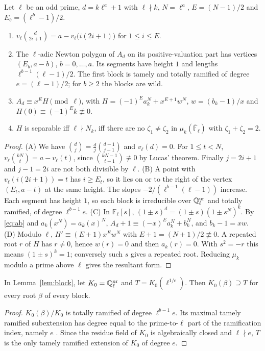 \documentclass[11pt]{amsart}
\theoremstyle{definition}\newtheorem{definition}[theorem]{Definition}\newtheorem{example}[theorem]{Example}
\theoremstyle{remark}\newtheorem{remark}[theorem]{Remark}
\newcommand{\Q}{\mathbb Q}\newcommand{\Z}{\mathbb Z}\newcommand{\F}{\mathbb F}
\begin{document}
\begin{lemma}\label{lem:block}
Let $\ell$ be an odd prime, $d=k\ell^a+1$ with $\ell\nmid k$, $N=\ell^a$, $E=(N-1)/2$ and $E_b=(\ell^b-1)/2$.
\begin{enumerate}
\item[(A)] $v_\ell\binom d{2i+1}=a-v_\ell\bigl(i(2i+1)\bigr)$ for $1\le i\le E$.
\item[(B)] The $\ell$-adic Newton polygon of $A_d$ on its positive-valuation part has vertices $(E_b,a-b)$, $b=0,\dots,a$. Its segments have height
$1$ and lengths $\ell^{b-1}(\ell-1)/2$. The first block is tamely and totally ramified of degree $e=(\ell-1)/2$; for $b\ge2$ the blocks are wild.
\item[(C)] $A_d\equiv x^EH\pmod\ell$, with $H=(-1)^Ea_k^N+x^{E+1}w^N$, $w=(b_k-1)/x$ and $H(0)\equiv(-1)^Ek\not\equiv0$.
\item[(D)] $H$ is separable iff $\ell\nmid N_k$, iff there are no $\zeta_1\ne\zeta_2$ in $\mu_k(\overline{\F}_\ell)$ with $\zeta_1+\zeta_2=2$.
\end{enumerate}
\end{lemma}
\begin{proof}
(A) We have $\binom dj=\frac dj\binom{d-1}{j-1}$ and $v_\ell(d)=0$. For $1\le t<N$, $v_\ell\binom{kN}t=a-v_\ell(t)$, since
$\binom{kN-1}{t-1}\not\equiv0$ by Lucas' theorem. Finally $j=2i+1$ and $j-1=2i$ are not both divisible by $\ell$.
(B) A point with $v_\ell(i(2i+1))=t$ has $i\ge E_t$, so it lies on or to the right of the vertex $(E_t,a-t)$ at the same height. The slopes
$-2/(\ell^{b-1}(\ell-1))$ increase. Each segment has height $1$, so each block is irreducible over $\Q_\ell^\ur$ and totally ramified, of degree
$\ell^{b-1}e$.
(C) In $\F_\ell[s]$, $(1\pm s)^d=(1\pm s)(1\pm s^N)^k$. By \eqref{eq:ab} and $a_k(x^N)=a_k(x)^N$,
$A_d+1\equiv(-x)^Ea_k^N+b_k^N$, and $b_k-1=xw$.
(D) Modulo $\ell$, $H'\equiv(E+1)x^Ew^N$ with $E+1=(N+1)/2\not\equiv0$. A repeated root $r$ of $H$ has $r\ne0$, hence $w(r)=0$ and then
$a_k(r)=0$. With $s^2=-r$ this means $(1\pm s)^k=1$; conversely such $s$ gives a repeated root. Reducing $\mu_k$ modulo a prime above $\ell$
gives the resultant form.
\end{proof}

\begin{lemma}\label{lem:contain}
In Lemma~\ref{lem:block}, let $K_0=\Q_\ell^\ur$ and $T=K_0(\ell^{1/e})$. Then $K_0(\beta)\supseteq T$ for every root $\beta$ of every block.
\end{lemma}
\begin{proof}
$K_0(\beta)/K_0$ is totally ramified of degree $\ell^{b-1}e$. Its maximal tamely ramified subextension has degree equal to the prime-to-$\ell$
part of the ramification index, namely $e$ \cite[Ch.~IV]{Serre}. Since the residue field of $K_0$ is algebraically closed and $\ell\nmid e$,
$T$ is the only tamely ramified extension of $K_0$ of degree $e$.
\end{proof}
\end{document}
